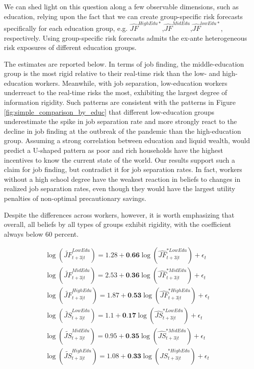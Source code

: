 We can shed light on this question along a few observable dimensions, such as education, relying upon the fact that we can create group-specific risk forecasts specifically for each education group, e.g. $\widehat{JF}^{HighEdu*}$,$\widehat{JF}^{MidEdu}$,$\widehat{JF}^{lowEdu*}$, respectively. Using group-specific risk forecasts admits the ex-ante heterogeneous risk exposures of different education groups. 


The estimates are reported below. In terms of job finding, the middle-education group is the most rigid relative to their real-time risk than the low- and high-education workers.  Meanwhile, with job separation, low-education workers underreact to the real-time risks the most, exhibiting the largest degree of information rigidity.  Such patterns are consistent with the patterns in Figure \ref{fig:simple_comparison_by_educ} that different low-education groups underestimate the spike in job separation rate and more strongly react to the decline in job finding at the outbreak of the pandemic than the high-education group. Assuming a strong correlation between education and liquid wealth, \citet{broer2021information} would predict a U-shaped pattern as poor and rich households have the highest incentives to know the current state of the world. Our results support such a claim for job finding, but contradict it for job separation rates. In fact, workers without a high school degree have the weakest reaction in beliefs to changes in realized job separation rates, even though they would have the largest utility penalties of non-optimal precautionary savings.

Despite the differences across workers, however, it is worth emphasizing that overall, all beliefs by all types of groups exhibit rigidity, with the coefficient always below 60 percent. 

  \begin{equation}
    \label{eq:jf_dist_est_edu}
    \begin{split}
      \log(\widetilde {JF}^{LowEdu}_{t+3|t}) = 1.28 + \textbf{0.66} \log(\widehat {JF}^{*LowEdu}_{t+3|t}) + \epsilon_{t}  \\
    \log(\widetilde {JF}^{MidEdu}_{t+3|t}) = 2.53+ \textbf{0.36} \log(\widehat {JF}^{*MidEdu}_{t+3|t}) + \epsilon_{t} \\
    \log(\widetilde {JF}^{HighEdu}_{t+3|t}) = 1.87 + \textbf{0.53} \log(\widehat {JF}^{*HighEdu}_{t+3|t}) + \epsilon_{t}  \\
       \log(\widetilde {JS}^{LowEdu}_{t+3|t}) = 1.1 + \textbf{0.17} \log(\widehat {JS}^{*LowEdu}_{t+3|t})+ \epsilon_{t}  \\
     \log(\widetilde {JS}^{MidEdu}_{t+3|t}) = 0.95+ \textbf{0.35} \log(\widehat {JS}^{*MidEdu}_{t+3|t}) + \epsilon_{t} \\
    \log(\widetilde {JS}^{HighEdu}_{t+3|t}) = 1.08 + \textbf{0.33} \log(\widehat {JS}^{*HighEdu}_{t+3|t}) + \epsilon_{t} 
    \end{split}
\end{equation}
